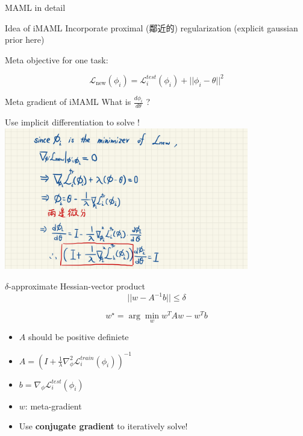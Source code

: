 \documentclass{beamer}
\begin{document}
\begin{fraMe}[t]{MAML in detail}
\begin{frame}[t]{Idea of iMAML}
  Incorporate proximal (鄰近的) regularization (explicit gaussian prior here)

  Meta objective for one task:

  \begin{equation*}
    \boxed{\mathcal{L}_{\text{new}}(\phi_i) = \mathcal{L}^{test}_i(\phi_i) + ||\phi_i - \theta||^2}
  \end{equation*}
\end{frame}

\begin{frame}[t]{Meta gradient of iMAML}
  What is $\frac{d \phi_i}{d \theta}$ ?

  Use implicit differentiation to solve !
  \center \includegraphics[width=0.8\textwidth]{fig/iMAML-grad.png}
\end{frame}

\begin{frame}[t]{$\delta$-approximate Hessian-vector product}
  \begin{equation*}
    ||w - A^{-1}b|| \leq \delta
  \end{equation*}

  \begin{equation*}
    \boxed{ w^\star = \arg\min_w w^T A w - w^T b }
  \end{equation*}

  \begin{itemize}
    \item $A$ should be positive definiete
    \item $A = (I + \frac{1}{\lambda}\nabla^2_\phi\mathcal{L}^{train}_i(\phi_i))^{-1}$
    \item $b = \nabla_\phi \mathcal{L}^{test}_i(\phi_i)$
    \item $w$: meta-gradient
    \item Use \textbf{conjugate gradient} to iteratively solve!
  \end{itemize}
\end{frame}


\end{fraMe}
\end{document}
